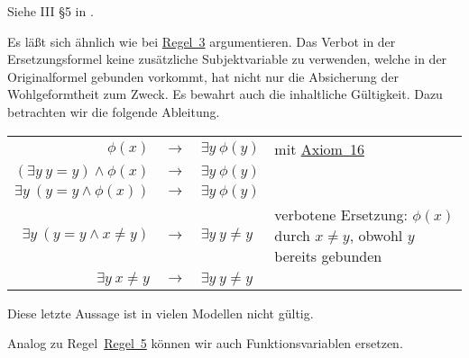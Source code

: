 \documentclass[a4paper,german,10pt,twoside]{book}
\theoremstyle{definition}
\theoremstyle{remark}
\begin{document}
Siehe III \S 5 in \cite{hilback}.

\par
Es l{\"a}{\ss}t sich {\"a}hnlich wie bei \hyperlink{rule:replaceFree}{Regel~3} argumentieren.
Das Verbot in der Ersetzungsformel keine zus{\"a}tzliche Subjektvariable zu verwenden, welche in der Originalformel gebunden vorkommt, hat nicht nur die Absicherung der Wohlgeformtheit zum Zweck. Es bewahrt auch die inhaltliche G{\"u}ltigkeit. Dazu betrachten wir die folgende Ableitung.

\par
\begin{tabularx}{\linewidth}{rclX}
  $ \phi(x)$                             & $\rightarrow$ & $\exists y \ \phi(y)$  
    & mit \hyperlink{axiom:existencialGeneralization}{Axiom~16} \\
  $ (\exists y \ y = y) \land \phi(x)$   & $\rightarrow$ & $\exists y \ \phi(y)$  
    &  \\
  $ \exists y \ (y = y \land \phi(x))$   & $\rightarrow$ & $\exists y \ \phi(y)$  
    &  \\
  $ \exists y \ (y = y \land x \neq y)$  & $\rightarrow$ & $\exists y \ y \neq y$  
    & verbotene Ersetzung: $\phi(x)$ durch $x \neq y$, obwohl $y$ bereits gebunden \\
  $ \exists y \  x \neq y$  & $\rightarrow$ & $\exists y \ y \neq y$  
    &
\end{tabularx}

\par
Diese letzte Aussage ist in vielen Modellen nicht g{\"u}ltig.


\par
Analog zu Regel~\hyperlink{rule:replacePred}{Regel~5} k{\"o}nnen wir auch Funktionsvariablen ersetzen.
\end{document}
